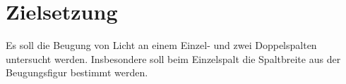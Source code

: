 
\section{Zielsetzung}
\label{sec:Zielsetzung}
Es soll die Beugung von Licht an einem Einzel- und zwei Doppelspalten untersucht werden. Insbesondere soll beim Einzelspalt die Spaltbreite aus der Beugungsfigur bestimmt werden.
